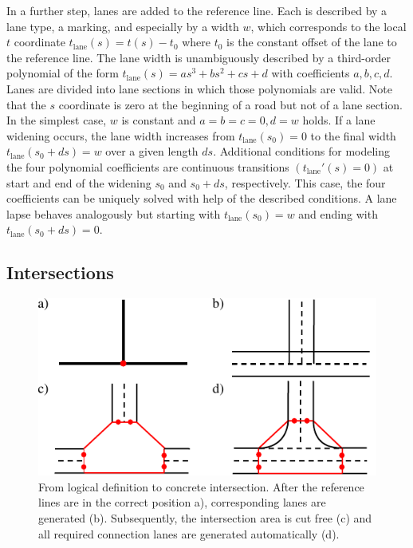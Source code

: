 \documentclass[a4paper, 10pt, conference]{ieeeconf}      %
\begin{document}
    In a further step, lanes are added to the reference line. Each is described by a lane type, a marking, and especially by a width $w$, which corresponds to the local $t$ coordinate $t_\text{lane}(s)=t(s)-t_0$ where $t_0$ is the constant offset of the lane to the reference line. The lane width is unambiguously described by a third-order polynomial of the form $t_\text{lane}(s) = as^3 + bs^2 + cs + d$ with coefficients \(a,b,c,d\). Lanes are divided into lane sections in which those polynomials are valid. Note that the $s$ coordinate is zero at the beginning of a road but not of a lane section. In the simplest case, $w$ is constant and $a=b=c=0, d=w$ holds. If a lane widening occurs, the lane width increases from $t_\text{lane}(s_0)=0$ to the final width $t_\text{lane}(s_0+ds)=w$ over a given length $ds$. Additional conditions for modeling the four polynomial coefficients are continuous transitions \(\left(t_\text{lane}'(s) = 0\right)\) at start and end of the widening $s_0$ and $s_0 + ds$, respectively. This case, the four coefficients can be uniquely solved with help of the described conditions. A lane lapse behaves analogously but starting with $t_\text{lane}(s_0)=w$ and ending with $t_\text{lane}(s_0+ds)=0$.
        
\subsection{Intersections}\label{sec_inters}
    \begin{figure}[tb]        
        \centering
        \includegraphics{fig/createJunction.pdf}
        \caption{From logical definition to concrete intersection. After the reference lines are in the correct position a), corresponding lanes are generated (b). Subsequently, the intersection area is cut free (c) and all required connection lanes are generated automatically (d).}
        \label{fig_createJunction}
    \end{figure}
	
\end{document}
